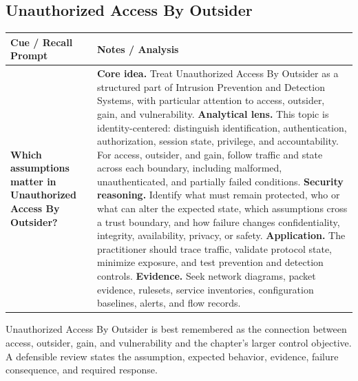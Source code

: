 \documentclass[11pt]{article}
\newcommand{\CornellHeader}{%
\rowcolor{Navy}\color{white}\bfseries Cue / Recall Prompt & \color{white}\bfseries Notes / Analysis\\\hline}
\newcommand{\CornellRow}[2]{%
\cellcolor{CueGray}\RaggedRight\textbf{#1} & \RaggedRight #2\\\hline}
\begin{document}
\subsection*{Unauthorized Access By Outsider}
\begin{longtable}{>{\RaggedRight\arraybackslash}p{}|>{\RaggedRight\arraybackslash}p{}}
\CornellHeader
\CornellRow{Which assumptions matter in Unauthorized Access By Outsider?}{\textbf{Core idea.} Treat Unauthorized Access By Outsider as a structured part of Intrusion Prevention and Detection Systems, with particular attention to access, outsider, gain, and vulnerability. \textbf{Analytical lens.} This topic is identity-centered: distinguish identification, authentication, authorization, session state, privilege, and accountability. For access, outsider, and gain, follow traffic and state across each boundary, including malformed, unauthenticated, and partially failed conditions. \textbf{Security reasoning.} Identify what must remain protected, who or what can alter the expected state, which assumptions cross a trust boundary, and how failure changes confidentiality, integrity, availability, privacy, or safety. \textbf{Application.} The practitioner should trace traffic, validate protocol state, minimize exposure, and test prevention and detection controls. \textbf{Evidence.} Seek network diagrams, packet evidence, rulesets, service inventories, configuration baselines, alerts, and flow records.}
\end{longtable}
\begin{topicsummary}
Unauthorized Access By Outsider is best remembered as the connection between access, outsider, gain, and vulnerability and the chapter's larger control objective. A defensible review states the assumption, expected behavior, evidence, failure consequence, and required response.
\end{topicsummary}
\end{document}
